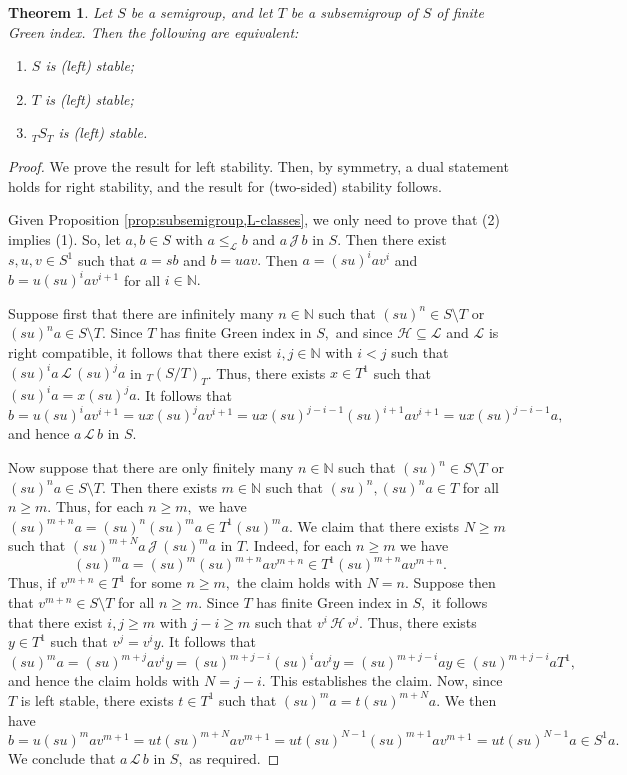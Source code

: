 \documentclass[twoside,a4paper,12pt,reqno]{amsart}
\theoremstyle{plain}
\newtheorem{thm}{Theorem}[section]
\theoremstyle{definition}
\renewcommand{\l}{\mbox{${\mathcal{L}}$}}
\newcommand{\h}{\mbox{${\mathcal{H}}$}}
\renewcommand{\j}{\mbox{${\mathcal{J}}$}}
\newcommand{\leql}{\leq_{\mathcal{L}}}
\newcommand{\N}{\mathbb{N}}
\newcommand{\sm}{\setminus}
\begin{document}
\begin{thm}\label{thm:Greenindex,stab}
Let $S$ be a semigroup, and let $T$ be a subsemigroup of $S$ of finite Green index.  Then the following are equivalent:
\begin{enumerate}[leftmargin=*]
\item[\emph{(1)}] $S$ is (left) stable;
\item[\emph{(2)}] $T$ is (left) stable;
\item[\emph{(3)}] ${_T}S_T$ is (left) stable.
\end{enumerate}
\end{thm}

\begin{proof}
We prove the result for left stability.  Then, by symmetry, a dual statement holds for right stability, and the result for (two-sided) stability follows.   

Given Proposition \ref{prop:subsemigroup,L-classes}, we only need to prove that (2) implies (1).  So, let $a,b\in S$ with $a\leql b$ and $a\,\j\,b$ in $S.$  Then there exist $s,u,v\in S^1$ such that $a=sb$ and $b=uav.$  Then $a=(su)^iav^i$ and $b=u(su)^iav^{i+1}$ for all $i\in\N.$ 

Suppose first that there are infinitely many $n\in\N$ such that $(su)^n\in S{\sm}T$ or $(su)^na\in S{\sm}T.$  Since $T$ has finite Green index in $S,$ and since $\h\subseteq\l$ and $\l$ is right compatible, it follows that there exist $i,j\in\N$ with $i<j$ such that $(su)^ia\,\l\,(su)^ja$ in ${_T}(S/T)_T$.  Thus, there exists $x\in T^1$ such that $(su)^ia=x(su)^ja.$  It follows that
$$b=u(su)^iav^{i+1}=ux(su)^jav^{i+1}=ux(su)^{j-i-1}(su)^{i+1}av^{i+1}=ux(su)^{j-i-1}a,$$
and hence $a\,\l\,b$ in $S.$

Now suppose that there are only finitely many $n\in\N$ such that $(su)^n\in S{\sm}T$ or $(su)^na\in S{\sm}T.$  Then there exists $m\in\N$ such that $(su)^n,(su)^na\in T$ for all $n\geq m.$  Thus, for each $n\geq m,$ we have $(su)^{m+n}a=(su)^n(su)^ma\in T^1(su)^ma.$  We claim that there exists $N\geq m$ such that $(su)^{m+N}a\,\j\,(su)^ma$ in $T.$  Indeed, for each $n\geq m$ we have 
$$(su)^ma=(su)^m(su)^{m+n}av^{m+n}\in T^1(su)^{m+n}av^{m+n}.$$  
Thus, if $v^{m+n}\in T^1$ for some $n\geq m,$ the claim holds with $N=n.$  Suppose then that $v^{m+n}\in S{\sm}T$ for all $n\geq m.$  Since $T$ has finite Green index in $S,$ it follows that there exist $i,j\geq m$ with $j-i\geq m$ such that $v^i\,\h\,v^j$.  Thus, there exists $y\in T^1$ such that $v^j=v^iy.$  It follows that
$$(su)^ma=(su)^{m+j}av^iy
=(su)^{m+j-i}(su)^iav^iy=(su)^{m+j-i}ay\in(su)^{m+j-i}aT^1,$$
and hence the claim holds with $N=j-i.$  This establishes the claim.  Now, since $T$ is left stable, there exists $t\in T^1$ such that $(su)^ma=t(su)^{m+N}a.$  We then have
$$b=u(su)^mav^{m+1}=ut(su)^{m+N}av^{m+1}
=ut(su)^{N-1}(su)^{m+1}av^{m+1}=ut(su)^{N-1}a\in S^1a.$$
We conclude that $a\,\l\,b$ in $S,$ as required.
\end{proof}
\end{document}
